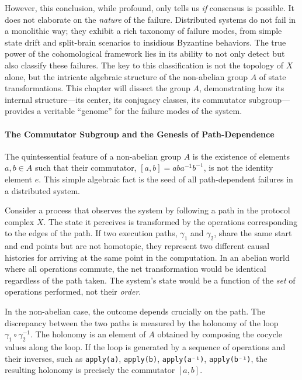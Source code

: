 \documentclass[
]{article}
\begin{document}
However, this conclusion, while profound, only tells us \emph{if}
consensus is possible. It does not elaborate on the \emph{nature} of the
failure. Distributed systems do not fail in a monolithic way; they
exhibit a rich taxonomy of failure modes, from simple state drift and
split-brain scenarios to insidious Byzantine behaviors. The true power
of the cohomological framework lies in its ability to not only detect
but also classify these failures. The key to this classification is not
the topology of \(X\) alone, but the intricate algebraic structure of
the non-abelian group \(A\) of state transformations. This chapter will
dissect the group \(A\), demonstrating how its internal structure---its
center, its conjugacy classes, its commutator subgroup---provides a
veritable ``genome'' for the failure modes of the system.

\paragraph{The Commutator Subgroup and the Genesis of
Path-Dependence}\label{the-commutator-subgroup-and-the-genesis-of-path-dependence}

The quintessential feature of a non-abelian group \(A\) is the existence
of elements \(a, b \in A\) such that their commutator,
\([a, b] = aba^{-1}b^{-1}\), is not the identity element \(e\). This
simple algebraic fact is the seed of all path-dependent failures in a
distributed system.

Consider a process that observes the system by following a path in the
protocol complex \(X\). The state it perceives is transformed by the
operations corresponding to the edges of the path. If two execution
paths, \(\gamma_1\) and \(\gamma_2\), share the same start and end
points but are not homotopic, they represent two different causal
histories for arriving at the same point in the computation. In an
abelian world where all operations commute, the net transformation would
be identical regardless of the path taken. The system's state would be a
function of the \emph{set} of operations performed, not their
\emph{order}.

In the non-abelian case, the outcome depends crucially on the path. The
discrepancy between the two paths is measured by the holonomy of the
loop \(\gamma_1 \circ \gamma_2^{-1}\). The holonomy is an element of
\(A\) obtained by composing the cocycle values along the loop. If the
loop is generated by a sequence of operations and their inverses, such
as \texttt{apply(a)}, \texttt{apply(b)}, \texttt{apply(a⁻¹)},
\texttt{apply(b⁻¹)}, the resulting holonomy is precisely the commutator
\([a, b]\).
\end{document}
